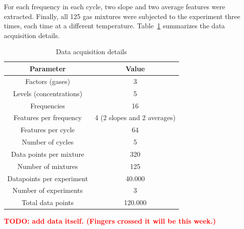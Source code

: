 For each frequency in each cycle, two slope and two average features were extracted. Finally, all 125 gas mixtures were subjected to the experiment three times, each time at a different temperature. Table~\ref{tab:measurements} summarizes the data acquisition details.

\begin{table}[h]
	\centering
	\begin{tabular}{|c|c|}
		\hline
		\textbf{Parameter} & \textbf{Value} \\
		\hline
		Factors (gases) & 3 \\
		\hline
		Levels (concentrations) & 5 \\
		\hline
		Frequencies & 16 \\
		\hline
		Features per frequency & 4 (2 slopes and 2 averages) \\
		\hline
		Features per cycle & 64 \\
		\hline
		Number of cycles & 5 \\
		\hline
		Data points per mixture & 320 \\
		\hline
		Number of mixtures & 125 \\
		\hline
		Datapoints per experiment & 40.000 \\
		\hline
		Number of experiments & 3 \\
		\hline
		Total data points & 120.000 \\
		\hline
	\end{tabular}
\caption{Data acquisition details}
\label{tab:measurements}
\end{table}

\textbf{\textcolor{red}{TODO: add data itself. (Fingers crossed it will be this week.)}}
